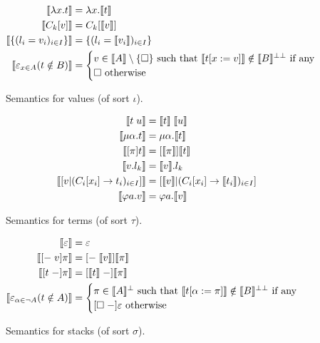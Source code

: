 \begin{figure}
  \begin{align*}
    \llbracket \lambda x.t \rrbracket
      &= \lambda x.\llbracket t \rrbracket\\
    \llbracket C_k[v] \rrbracket
      &= C_k[\llbracket v \rrbracket]\\
    \llbracket \{(l_i=v_i)_{i \in I}\} \rrbracket
      &= \{(l_i = \llbracket v_i \rrbracket)_{i \in I}\}\\
    \llbracket \varepsilon_{x \in A}(t \notin B) \rrbracket
      &= \begin{cases}
           v \in \llbracket A \rrbracket \setminus \{\square\}
             \text{ such that } \llbracket t[x := v] \rrbracket \notin
             \llbracket B \rrbracket^{\bot\bot} \text{ if any}\\
           \square \text { otherwise}
         \end{cases}
  \end{align*}
  \caption{Semantics for values (of sort $\iota$).}
  \label{semiota}
\end{figure}

\begin{figure}
  \begin{align*}
    \llbracket t\;u \rrbracket
      &= \llbracket t \rrbracket\; \llbracket u \rrbracket\\
    \llbracket \mu\alpha.t \rrbracket
      &= \mu \alpha.\llbracket t \rrbracket\\
    \llbracket [\pi]t \rrbracket
      &= [\llbracket \pi \rrbracket]\llbracket t \rrbracket\\
    \llbracket v.l_k \rrbracket
      &= \llbracket v \rrbracket.l_k\\
    \llbracket [v|(C_i[x_i] \to t_i)_{i \in I}] \rrbracket
      &= [\llbracket v \rrbracket | (C_i[x_i]
         \to \llbracket t_i \rrbracket)_{i \in I}]\\
    \llbracket \varphi a.v \rrbracket
      &= \varphi a.\llbracket v \rrbracket
  \end{align*}
  \caption{Semantics for terms (of sort $\tau$).}
  \label{semtau}
\end{figure}

\begin{figure}
  \begin{align*}
    \llbracket \varepsilon \rrbracket &= \varepsilon\\
    \llbracket [-\;v]\pi \rrbracket
      &= [-\;\llbracket v \rrbracket]\llbracket \pi \rrbracket\\
    \llbracket [t\;-]\pi \rrbracket
      &= [\llbracket t \rrbracket\;-]\llbracket \pi \rrbracket\\
    \llbracket \varepsilon_{\alpha \in \lnot A}(t \notin A) \rrbracket
      &= \begin{cases}
           \pi \in \llbracket A \rrbracket^\bot \text{ such that }
             \llbracket t[\alpha := \pi] \rrbracket \notin
             \llbracket B \rrbracket^{\bot\bot} \text{ if any}\\
           [\square\;-]\varepsilon \text { otherwise}
         \end{cases}
  \end{align*}
  \caption{Semantics for stacks (of sort $\sigma$).}
  \label{semsigma}
\end{figure}

